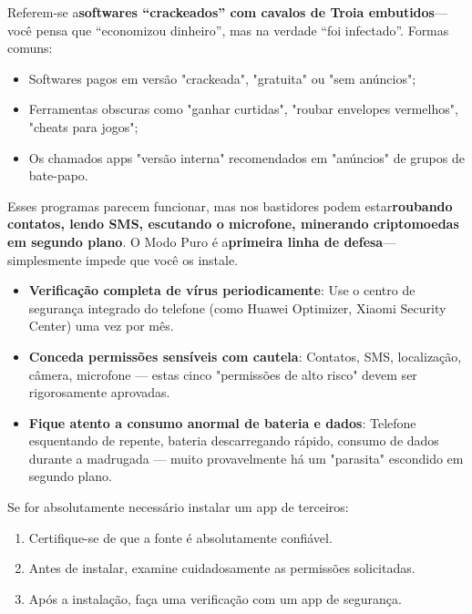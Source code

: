 Referem-se a\textbf{softwares “crackeados” com cavalos de Troia embutidos}— você pensa que “economizou dinheiro”, mas na verdade “foi infectado”. Formas comuns:

\begin{itemize}
  \item Softwares pagos em versão "crackeada", "gratuita" ou "sem anúncios";
  \item Ferramentas obscuras como "ganhar curtidas", "roubar envelopes vermelhos", "cheats para jogos";
  \item Os chamados apps "versão interna" recomendados em "anúncios" de grupos de bate-papo.
\end{itemize}

Esses programas parecem funcionar, mas nos bastidores podem estar\textbf{roubando contatos, lendo SMS, escutando o microfone, minerando criptomoedas em segundo plano}. O Modo Puro é a\textbf{primeira linha de defesa}— simplesmente impede que você os instale.


\begin{itemize}
  \item \textbf{Verificação completa de vírus periodicamente}: Use o centro de segurança integrado do telefone (como Huawei Optimizer, Xiaomi Security Center) uma vez por mês.
  \item \textbf{Conceda permissões sensíveis com cautela}: Contatos, SMS, localização, câmera, microfone — estas cinco "permissões de alto risco" devem ser rigorosamente aprovadas.
  \item \textbf{Fique atento a consumo anormal de bateria e dados}: Telefone esquentando de repente, bateria descarregando rápido, consumo de dados durante a madrugada — muito provavelmente há um "parasita" escondido em segundo plano.
\end{itemize}

Se for absolutamente necessário instalar um app de terceiros:

\begin{enumerate}
  \item Certifique-se de que a fonte é absolutamente confiável.
  \item Antes de instalar, examine cuidadosamente as permissões solicitadas.
  \item Após a instalação, faça uma verificação com um app de segurança.
\end{enumerate}

